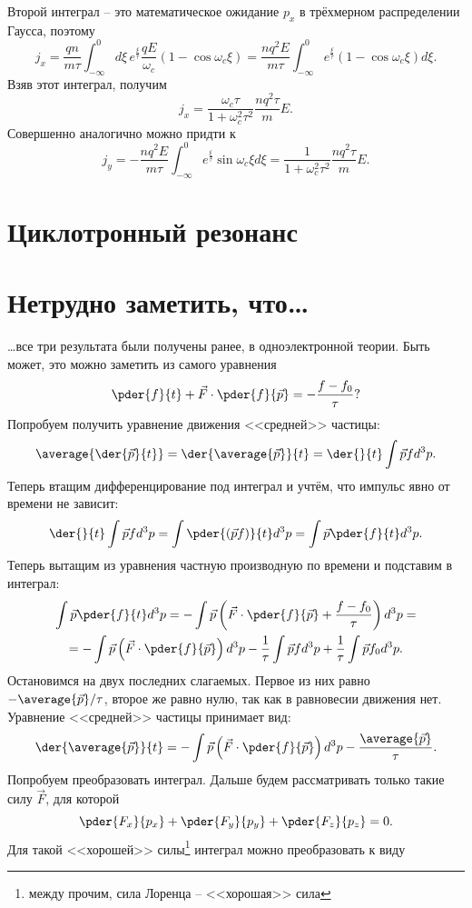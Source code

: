 Второй интеграл -- это математическое ожидание \( p_x \) в трёхмерном
распределении Гаусса, поэтому
\[
    j_x = \frac{qn}{m\tau} \int_{-\infty}^0 d\xi\, e^\frac{\xi}{\tau}
    \frac{qE}{\omega_c}(1-\cos\omega_c\xi) =
    \frac{nq^2E}{m\tau}
    \int_{-\infty}^0e^\frac{\xi}{\tau}(1-\cos\omega_c\xi)d\xi.
\]
Взяв этот интеграл, получим
\[
    j_x = \frac{\omega_c\tau}{1+\omega_c^2\tau^2}\frac{nq^2\tau}{m}E.
\]
Совершенно аналогично можно придти к
\[
    j_y = -\frac{nq^2E}{m\tau}
    \int_{-\infty}^0e^\frac{\xi}{\tau}\sin\omega_c\xi d\xi =
    \frac{1}{1+\omega_c^2\tau^2}\frac{nq^2\tau}{m}E.
\]

\section{Циклотронный резонанс}
\section{Нетрудно заметить, что\ldots}
\ldots все три результата были получены ранее, в одноэлектронной теории. Быть
может, это можно заметить из самого уравнения
\[
    \pder{f}{t} + \vec{F}\cdot\pder{f}{\vec{p}} = -\frac{f-f_0}{\tau}?
\]
Попробуем получить уравнение движения <<средней>> частицы:
\[
    \average{\der{\vec{p}}{t}} = \der{\average{\vec{p}}}{t} =
    \der{}{t}\int\vec{p} f d^3p.
\]
Теперь втащим дифференцирование под интеграл и учтём, что импульс явно от
времени не зависит:
\[
    \der{}{t}\int\vec{p} f d^3p = \int\pder{(\vec{p} f)}{t} d^3p =
    \int\vec{p}\pder{f}{t} d^3p.
\]
Теперь вытащим из уравнения частную производную по времени и подставим в
интеграл:
\begin{gather*}
    \int\vec{p}\pder{f}{t} d^3p = -\int\vec{p}
    \left(\vec{F}\cdot\pder{f}{\vec{p}} + \frac{f-f_0}{\tau}\right)d^3p = \\ =
    -\int\vec{p}\left(\vec{F}\cdot\pder{f}{\vec{p}}\right)d^3p
    -\frac{1}{\tau}\int\vec{p}fd^3p + \frac{1}{\tau}\int\vec{p}f_0d^3p.
\end{gather*}
Остановимся на двух последних слагаемых. Первое из них равно
\( -\average{\vec{p}}/\tau \), второе же равно нулю, так как в равновесии
движения нет. Уравнение <<средней>> частицы принимает вид:
\[
    \der{\average{\vec{p}}}{t} =
    -\int\vec{p}\left(\vec{F}\cdot\pder{f}{\vec{p}}\right)d^3p
    -\frac{\average{\vec{p}}}{\tau}.
\]
Попробуем преобразовать интеграл. Дальше будем рассматривать только такие силу
\( \vec{F} \), для которой
\[
    \pder{F_x}{p_x} + \pder{F_y}{p_y} + \pder{F_z}{p_z} = 0.
\]
Для такой <<хорошей>> силы\footnote{между прочим, сила Лоренца -- <<хорошая>>
сила} интеграл можно преобразовать к виду
